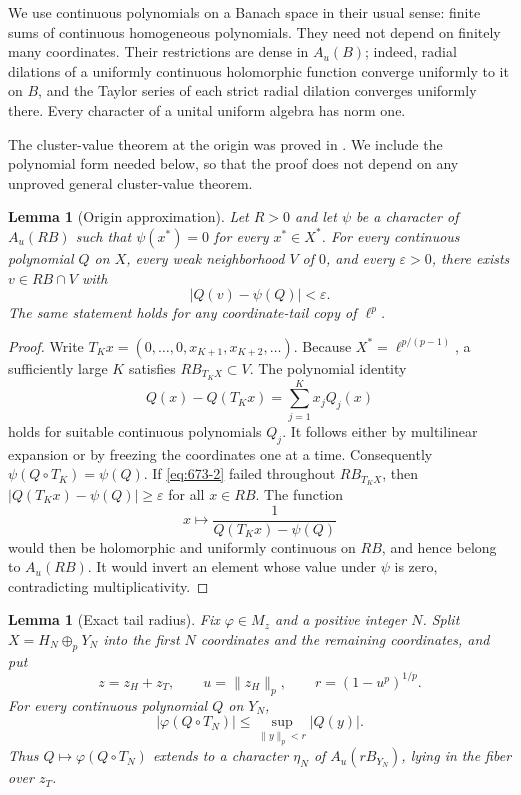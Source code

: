 \documentclass[11pt,a4paper]{article}
\newtheorem{lemma}[theorem]{Lemma}
\theoremstyle{remark}
\begin{document}
We use continuous polynomials on a Banach space in their usual sense:
finite sums of continuous homogeneous polynomials.  They need not
depend on finitely many coordinates.  Their restrictions are dense
in $A_u(B)$; indeed, radial dilations of a uniformly continuous
holomorphic function converge uniformly to it on $B$, and the Taylor
series of each strict radial dilation converges uniformly there.
Every character of a unital uniform algebra has norm one.

The cluster-value theorem at the origin was proved in
\cite[Theorem 3.1]{AronCarandoGamelinLassalleMaestre2012}.
We include the polynomial form needed below, so that the proof does
not depend on any unproved general cluster-value theorem.

\begin{lemma}[Origin approximation]
Let $R>0$ and let $\psi$ be a character of $A_u(RB)$ such that
$\psi(x^*)=0$ for every $x^*\in X^*$.  For every continuous polynomial
$Q$ on $X$, every weak neighborhood $V$ of $0$, and every
$\varepsilon>0$, there exists $v\in RB\cap V$ with
\begin{equation}
 |Q(v)-\psi(Q)|<\varepsilon.
 \label{eq:673-2}
\end{equation}
The same statement holds for any coordinate-tail copy of $\ell^p$.
\end{lemma}

\begin{proof}
Write $T_Kx=(0,\ldots,0,x_{K+1},x_{K+2},\ldots)$.
Because $X^*=\ell^{p/(p-1)}$, a sufficiently large $K$ satisfies
$R B_{T_KX}\subset V$.  The polynomial identity
\[
 Q(x)-Q(T_Kx)=\sum_{j=1}^K x_j Q_j(x)
\]
holds for suitable continuous polynomials $Q_j$.  It follows either
by multilinear expansion or by freezing the coordinates one at a
time.  Consequently $\psi(Q\circ T_K)=\psi(Q)$.
If \eqref{eq:673-2} failed throughout $R B_{T_KX}$, then
$|Q(T_Kx)-\psi(Q)|\ge\varepsilon$ for all $x\in RB$.
The function
\[
 x\longmapsto\frac1{Q(T_Kx)-\psi(Q)}
\]
would then be holomorphic and uniformly continuous on $RB$, and hence
belong to $A_u(RB)$.  It would invert an element whose value under
$\psi$ is zero, contradicting multiplicativity.
\end{proof}

\begin{lemma}[Exact tail radius]
Fix $\varphi\in M_z$ and a positive integer $N$.  Split
$X=H_N\oplus_p Y_N$ into the first $N$ coordinates and the remaining
coordinates, and put
\begin{equation}
 z=z_H+z_T,\qquad
 u=\|z_H\|_p,\qquad r=(1-u^p)^{1/p}.
 \label{eq:673-3}
\end{equation}
For every continuous polynomial $Q$ on $Y_N$,
\begin{equation}
 |\varphi(Q\circ T_N)|\le\sup_{\|y\|_p<r}|Q(y)|.
 \label{eq:673-4}
\end{equation}
Thus $Q\mapsto\varphi(Q\circ T_N)$ extends to a character
$\eta_N$ of $A_u(rB_{Y_N})$, lying in the fiber over $z_T$.
\end{lemma}
\end{document}

